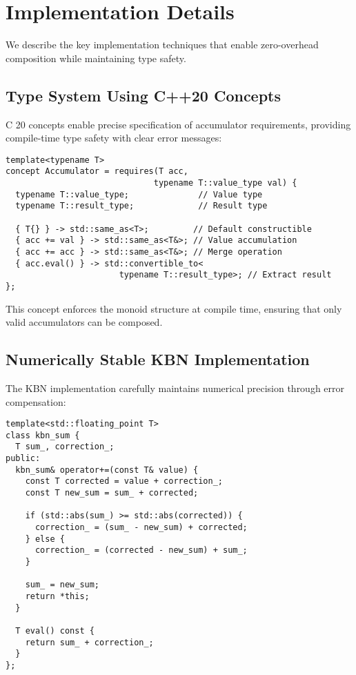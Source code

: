 \documentclass[sigconf]{acmart}
\newcommand{\cpp}{C\nolinebreak\hspace{-.05em}\raisebox{.4ex}{\tiny\bf +}\nolinebreak\hspace{-.10em}\raisebox{.4ex}{\tiny\bf +}\xspace}
\begin{document}
\section{Implementation Details}

We describe the key implementation techniques that enable zero-overhead composition while maintaining type safety.

\subsection{Type System Using C++20 Concepts}

\cpp20 concepts enable precise specification of accumulator requirements, providing compile-time type safety with clear error messages:

\begin{lstlisting}[caption={Core accumulator concept definition},label={lst:concept}]
template<typename T>
concept Accumulator = requires(T acc,
                              typename T::value_type val) {
  typename T::value_type;              // Value type
  typename T::result_type;             // Result type

  { T{} } -> std::same_as<T>;         // Default constructible
  { acc += val } -> std::same_as<T&>; // Value accumulation
  { acc += acc } -> std::same_as<T&>; // Merge operation
  { acc.eval() } -> std::convertible_to<
                       typename T::result_type>; // Extract result
};
\end{lstlisting}

This concept enforces the monoid structure at compile time, ensuring that only valid accumulators can be composed.

\subsection{Numerically Stable KBN Implementation}

The KBN implementation carefully maintains numerical precision through error compensation:

\begin{lstlisting}[caption={KBN summation core algorithm},label={lst:kbn}]
template<std::floating_point T>
class kbn_sum {
  T sum_, correction_;
public:
  kbn_sum& operator+=(const T& value) {
    const T corrected = value + correction_;
    const T new_sum = sum_ + corrected;

    if (std::abs(sum_) >= std::abs(corrected)) {
      correction_ = (sum_ - new_sum) + corrected;
    } else {
      correction_ = (corrected - new_sum) + sum_;
    }

    sum_ = new_sum;
    return *this;
  }

  T eval() const {
    return sum_ + correction_;
  }
};
\end{lstlisting}
\end{document}
